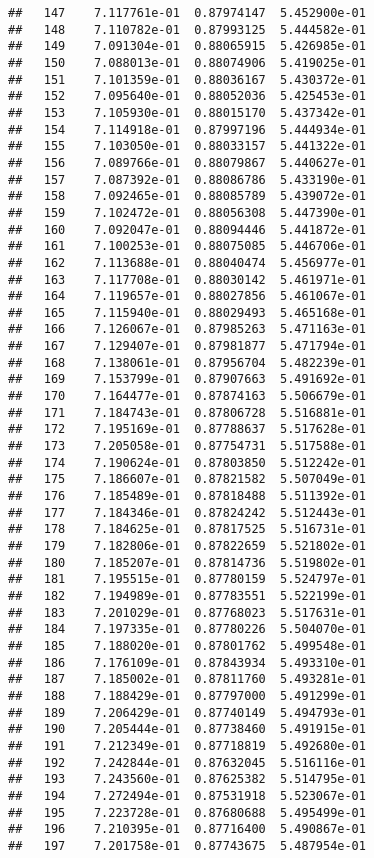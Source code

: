 \documentclass[]{article}
\begin{document}
\begin{verbatim}
##   147    7.117761e-01  0.87974147  5.452900e-01
##   148    7.110782e-01  0.87993125  5.444582e-01
##   149    7.091304e-01  0.88065915  5.426985e-01
##   150    7.088013e-01  0.88074906  5.419025e-01
##   151    7.101359e-01  0.88036167  5.430372e-01
##   152    7.095640e-01  0.88052036  5.425453e-01
##   153    7.105930e-01  0.88015170  5.437342e-01
##   154    7.114918e-01  0.87997196  5.444934e-01
##   155    7.103050e-01  0.88033157  5.441322e-01
##   156    7.089766e-01  0.88079867  5.440627e-01
##   157    7.087392e-01  0.88086786  5.433190e-01
##   158    7.092465e-01  0.88085789  5.439072e-01
##   159    7.102472e-01  0.88056308  5.447390e-01
##   160    7.092047e-01  0.88094446  5.441872e-01
##   161    7.100253e-01  0.88075085  5.446706e-01
##   162    7.113688e-01  0.88040474  5.456977e-01
##   163    7.117708e-01  0.88030142  5.461971e-01
##   164    7.119657e-01  0.88027856  5.461067e-01
##   165    7.115940e-01  0.88029493  5.465168e-01
##   166    7.126067e-01  0.87985263  5.471163e-01
##   167    7.129407e-01  0.87981877  5.471794e-01
##   168    7.138061e-01  0.87956704  5.482239e-01
##   169    7.153799e-01  0.87907663  5.491692e-01
##   170    7.164477e-01  0.87874163  5.506679e-01
##   171    7.184743e-01  0.87806728  5.516881e-01
##   172    7.195169e-01  0.87788637  5.517628e-01
##   173    7.205058e-01  0.87754731  5.517588e-01
##   174    7.190624e-01  0.87803850  5.512242e-01
##   175    7.186607e-01  0.87821582  5.507049e-01
##   176    7.185489e-01  0.87818488  5.511392e-01
##   177    7.184346e-01  0.87824242  5.512443e-01
##   178    7.184625e-01  0.87817525  5.516731e-01
##   179    7.182806e-01  0.87822659  5.521802e-01
##   180    7.185207e-01  0.87814736  5.519802e-01
##   181    7.195515e-01  0.87780159  5.524797e-01
##   182    7.194989e-01  0.87783551  5.522199e-01
##   183    7.201029e-01  0.87768023  5.517631e-01
##   184    7.197335e-01  0.87780226  5.504070e-01
##   185    7.188020e-01  0.87801762  5.499548e-01
##   186    7.176109e-01  0.87843934  5.493310e-01
##   187    7.185002e-01  0.87811760  5.493281e-01
##   188    7.188429e-01  0.87797000  5.491299e-01
##   189    7.206429e-01  0.87740149  5.494793e-01
##   190    7.205444e-01  0.87738460  5.491915e-01
##   191    7.212349e-01  0.87718819  5.492680e-01
##   192    7.242844e-01  0.87632045  5.516116e-01
##   193    7.243560e-01  0.87625382  5.514795e-01
##   194    7.272494e-01  0.87531918  5.523067e-01
##   195    7.223728e-01  0.87680688  5.495499e-01
##   196    7.210395e-01  0.87716400  5.490867e-01
##   197    7.201758e-01  0.87743675  5.487954e-01

\end{verbatim}
\end{document}
